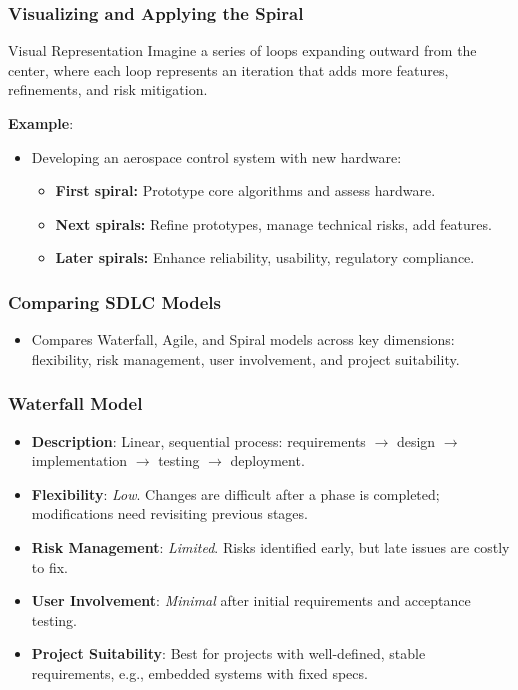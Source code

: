 \documentclass{beamer}
\begin{document}
\begin{frame}[fragile]
    \frametitle{Visualizing and Applying the Spiral}
    \begin{block}{Visual Representation}
        Imagine a series of loops expanding outward from the center, where each loop represents an iteration that adds more features, refinements, and risk mitigation.
    \end{block}
    \vspace{0.5cm}
    \textbf{Example}:
    \begin{itemize}
        \item Developing an aerospace control system with new hardware:
        \begin{itemize}
            \item \textbf{First spiral:} Prototype core algorithms and assess hardware.
            \item \textbf{Next spirals:} Refine prototypes, manage technical risks, add features.
            \item \textbf{Later spirals:} Enhance reliability, usability, regulatory compliance.
        \end{itemize}
    \end{itemize}
\end{frame}

\begin{frame}[fragile]
  \frametitle{Comparing SDLC Models}
  
  \begin{itemize}
    \item Compares Waterfall, Agile, and Spiral models across key dimensions: flexibility, risk management, user involvement, and project suitability.
  \end{itemize}
\end{frame}

\begin{frame}[fragile]
  \frametitle{Waterfall Model}
  
  \begin{itemize}
    \item \textbf{Description}: Linear, sequential process: requirements $\rightarrow$ design $\rightarrow$ implementation $\rightarrow$ testing $\rightarrow$ deployment.
    \item \textbf{Flexibility}: \textit{Low}. Changes are difficult after a phase is completed; modifications need revisiting previous stages.
    \item \textbf{Risk Management}: \textit{Limited}. Risks identified early, but late issues are costly to fix.
    \item \textbf{User Involvement}: \textit{Minimal} after initial requirements and acceptance testing.
    \item \textbf{Project Suitability}: Best for projects with well-defined, stable requirements, e.g., embedded systems with fixed specs.
  \end{itemize}
\end{frame}
\end{document}

